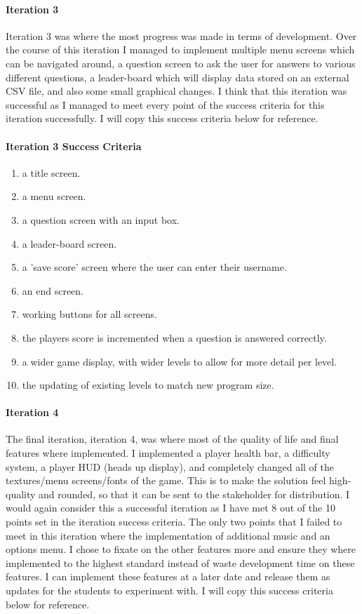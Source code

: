 \documentclass[12pt]{report}
\begin{document}
\pagebreak

\footnotesize

\paragraph{Iteration 3}
Iteration 3 was where the most progress was made in terms of development. Over the course of this iteration I managed to implement multiple menu screens which can be navigated around, a question screen to ask the user for answers to various different questions, a leader-board which will display data stored on an external CSV file, and also some small graphical changes. I think that this iteration was successful as I managed to meet every point of the success criteria for this iteration successfully. I will copy this success criteria below for reference.

\paragraph{Iteration 3 Success Criteria}
\begin{enumerate}
    \item a title screen.
    \item a menu screen. 
    \item a question screen with an input box.
    \item a leader-board screen.
    \item a 'save score' screen where the user can enter their username.
    \item an end screen.
    \item working buttons for all screens.
    \item the players score is incremented when a question is answered correctly.
    \item a wider game display, with wider levels to allow for more detail per level.
    \item the updating of existing levels to match new program size.
\end{enumerate}

\paragraph{Iteration 4}
The final iteration, iteration 4, was where most of the quality of life and final features where implemented. I implemented a player health bar, a difficulty system, a player HUD (heads up display), and completely changed all of the textures/menu screens/fonts of the game. This is to make the solution feel high-quality and rounded, so that it can be sent to the stakeholder for distribution. I would again consider this a successful iteration as I have met 8 out of the 10 points set in the iteration success criteria. The only two points that I failed to meet in this iteration where the implementation of additional music and an options menu. I chose to fixate on the other features more and ensure they where implemented to the highest standard instead of waste development time on these features. I can implement these features at a later date and release them as updates for the students to experiment with. I will copy this success criteria below for reference.
\end{document}
